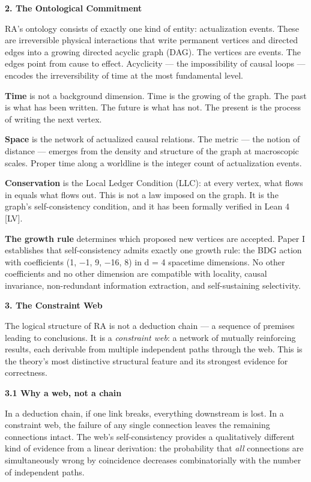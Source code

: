 \documentclass[12pt,a4paper]{article}
\begin{document}
\textbf{2. The Ontological Commitment}

RA's ontology consists of exactly one kind of entity: actualization
events. These are irreversible physical interactions that write
permanent vertices and directed edges into a growing directed acyclic
graph (DAG). The vertices are events. The edges point from cause to
effect. Acyclicity --- the impossibility of causal loops --- encodes the
irreversibility of time at the most fundamental level.

\textbf{Time} is not a background dimension. Time is the growing of the
graph. The past is what has been written. The future is what has not.
The present is the process of writing the next vertex.

\textbf{Space} is the network of actualized causal relations. The metric
--- the notion of distance --- emerges from the density and structure of
the graph at macroscopic scales. Proper time along a worldline is the
integer count of actualization events.

\textbf{Conservation} is the Local Ledger Condition (LLC): at every
vertex, what flows in equals what flows out. This is not a law imposed
on the graph. It is the graph's self-consistency condition, and it has
been formally verified in Lean 4 {[}LV{]}.

\textbf{The growth rule} determines which proposed new vertices are
accepted. Paper I establishes that self-consistency admits exactly one
growth rule: the BDG action with coefficients (1, −1, 9, −16, 8) in d =
4 spacetime dimensions. No other coefficients and no other dimension are
compatible with locality, causal invariance, non-redundant information
extraction, and self-sustaining selectivity.

\textbf{3. The Constraint Web}

The logical structure of RA is not a deduction chain --- a sequence of
premises leading to conclusions. It is a \emph{constraint web}: a
network of mutually reinforcing results, each derivable from multiple
independent paths through the web. This is the theory's most distinctive
structural feature and its strongest evidence for correctness.

\textbf{3.1 Why a web, not a chain}

In a deduction chain, if one link breaks, everything downstream is lost.
In a constraint web, the failure of any single connection leaves the
remaining connections intact. The web's self-consistency provides a
qualitatively different kind of evidence from a linear derivation: the
probability that \emph{all} connections are simultaneously wrong by
coincidence decreases combinatorially with the number of independent
paths.
\end{document}
